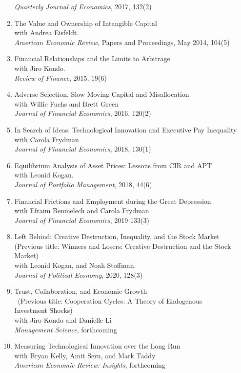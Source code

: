 \documentclass[11pt,letterpaper,serif,overlapped]{res}
\begin{document}
\begin{resume}
\begin{itemize}
\begin{enumerate}
\emph{Quarterly Journal of Economics}, 2017, 132(2)
\item The Value and Ownership of Intangible Capital\\ with Andrea Eisfeldt. \\
\emph{American Economic Review}, Papers and Proceedings, May 2014, 104(5)
\item Financial Relationships and the Limits to Arbitrage\\ with Jiro Kondo.\\
\emph{Review of Finance}, 2015, 19(6)
\item Adverse Selection, Slow Moving Capital and Misallocation\\ with Willie Fuchs and Brett Green\\
\emph{Journal of Financial Economics}, 2016, 120(2)
\item In Search of Ideas: Technological Innovation and Executive Pay Inequality\\ with Carola Frydman\\
\emph{Journal of Financial Economics}, 2018, 130(1)
\item Equilibrium Analysis of Asset Prices: Lessons from CIR and APT\\with Leonid Kogan. \\
\emph{Journal of Portfolio Management}, 2018, 44(6)
\item Financial Frictions and Employment during the Great Depression\\ with Efraim Benmelech and Carola Frydman\\\emph{Journal of Financial Economics}, 2019 133(3)
\item Left Behind: Creative Destruction, Inequality, and the Stock Market \\(Previous title:  Winners and Losers: Creative Destruction and the Stock Market)\\ with Leonid Kogan, and Noah Stoffman.\\\emph{Journal of Political Economy}, 2020, 128(3)
\item Trust, Collaboration, and Economic Growth \\\ (Previous title: Cooperation Cycles: A Theory of Endogenous Investment Shocks)\\ with Jiro Kondo and Danielle Li\\\emph{Management Science}, forthcoming
\item Measuring Technological Innovation over the Long Run\\ with Bryan Kelly, Amit Seru, and Mark Taddy\\\emph{American Economic Review: Insights}, forthcoming

\end{enumerate}
\end{itemize}
\end{resume}
\end{document}
